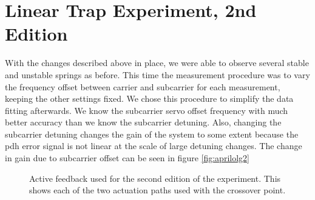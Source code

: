 \section{Linear Trap Experiment, 2nd Edition}
\label{sec:results_second}
With the changes described above in place, we were able to observe several
stable and unstable springs as before.
This time the measurement procedure was to vary the frequency offset between
carrier and subcarrier for each measurement, keeping the other settings fixed.
We chose this procedure to simplify the data fitting afterwards.
We know the subcarrier servo offset frequency with much better accuracy than we
know the subcarrier detuning.
Also, changing the subcarrier detuning changes the gain of the system to some
extent because the \ac{pdh} error signal is not linear at the scale of large
detuning changes. The change in gain due to subcarrier offset can be seen in
figure \ref{fig:aprilolg2}

\begin{figure}
\centering
  \caption[Active Feedback Control for 2nd Edition]{
    Active feedback used for the second edition of the experiment.
    This shows each of the two actuation paths used with the
    crossover point.
    }
  \label{fig:servoactuation}
\end{figure}


